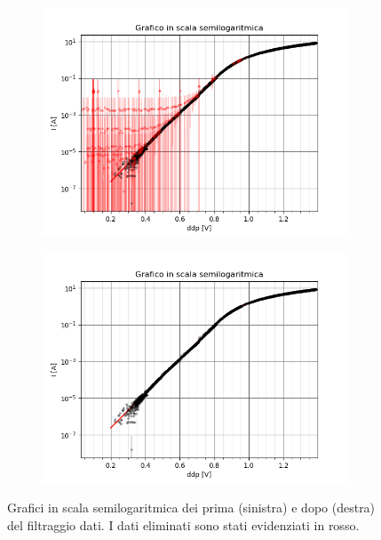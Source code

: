 \documentclass{article}[a4paper, oneside, 11pt]
\begin{document}
\begin{figure}[H]
\centering
\begin{subfigure}{.5\textwidth}
	\centering 
 		\includegraphics[scale=0.5]{./nofilter.png}
	\label{fig: nofilter}
\end{subfigure}%
\begin{subfigure}{.5\textwidth}
	\centering 
 		\includegraphics[scale=0.5]{./filtered.png}
	\label{fig: filtered}
\end{subfigure}
	\caption{Grafici in scala semilogaritmica dei prima (sinistra) e dopo (destra) del filtraggio dati. I dati eliminati sono stati evidenziati in rosso.}
\end{figure}
\end{document}
